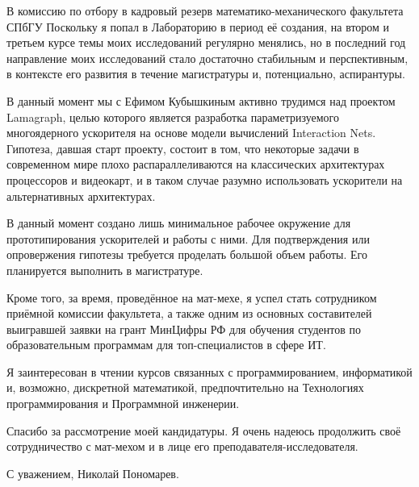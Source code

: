 \documentclass[foldmarks=false, enlargefirstpage=true,
    firstfoot=false, fromphone, fromemail, version=last]{scrlttr2}
\begin{document}
\begin{letter}{В комиссию по отбору в кадровый резерв математико-механического факультета СПбГУ}
    Поскольку я попал в Лабораторию в период её создания, на втором и третьем курсе темы моих исследований регулярно менялись, но в последний год направление моих исследований стало достаточно стабильным и перспективным, в контексте его развития в течение магистратуры и, потенциально, аспирантуры.

    В данный момент мы с Ефимом Кубышкиным активно трудимся над проектом Lamagraph, целью которого является разработка параметризуемого многоядерного ускорителя на основе модели вычислений \textenglish{Interaction Nets}.
    Гипотеза, давшая старт проекту, состоит в том, что некоторые задачи в современном мире плохо распараллеливаются на классических архитектурах процессоров и видеокарт, и в таком случае разумно использовать ускорители на альтернативных архитектурах.

    В данный момент создано лишь минимальное рабочее окружение для прототипирования ускорителей и работы с ними.
    Для подтверждения или опровержения гипотезы требуется проделать большой объем работы.
    Его планируется выполнить в магистратуре.

    Кроме того, за время, проведённое на мат-мехе, я успел стать сотрудником приёмной комиссии факультета, а также одним из основных составителей выигравшей заявки на грант МинЦифры РФ для обучения студентов по образовательным программам для топ-специалистов в сфере ИТ.

    Я заинтересован в чтении курсов связанных с  программированием, информатикой и, возможно, дискретной математикой, предпочтительно на Технологиях программирования и Программной инженерии.

    Спасибо за рассмотрение моей кандидатуры.
    Я очень надеюсь продолжить своё сотрудничество с мат-мехом и в лице его преподавателя-исследователя.

    \closing{С уважением, Николай Пономарев.}
\end{letter}
\end{document}
